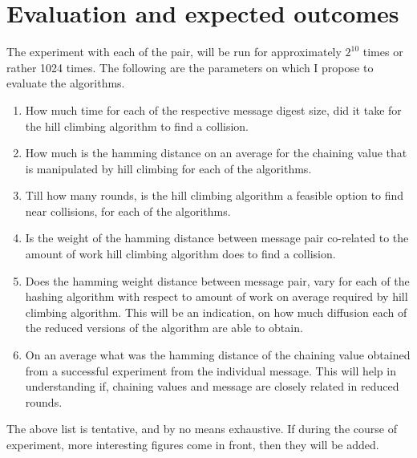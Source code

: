 \chapter{Evaluation and expected outcomes}




The experiment with each of the pair, will be run for approximately $2^{10}$ times or rather 1024 times.
The following are the parameters on which I propose to evaluate the algorithms. 

\begin{enumerate}
  \item How much time for each of the respective message digest size, did it take for the hill climbing
    algorithm to find a collision.
  \item How much is the hamming distance on an average for the chaining value that is manipulated by
    hill climbing for each of the algorithms.
  \item Till how many rounds, is the hill climbing algorithm a feasible option to find near collisions,
    for each of the algorithms.
  \item Is the weight of the hamming distance between message pair co-related to the amount of work
    hill climbing algorithm does to find a collision.
  \item Does the hamming weight distance between message pair, vary for each of the hashing algorithm
    with respect to amount of work on average required by hill climbing algorithm. This will be an
    indication, on how much diffusion each of the reduced versions of the algorithm are able to obtain.
  \item On an average what was the hamming distance of the chaining value obtained from a successful
    experiment from the individual message. This will help in understanding if, chaining values and
    message are closely related in reduced rounds.
\end{enumerate}

The above list is tentative, and by no means exhaustive. If during the course of experiment, more 
interesting figures come in front, then they will be added.
